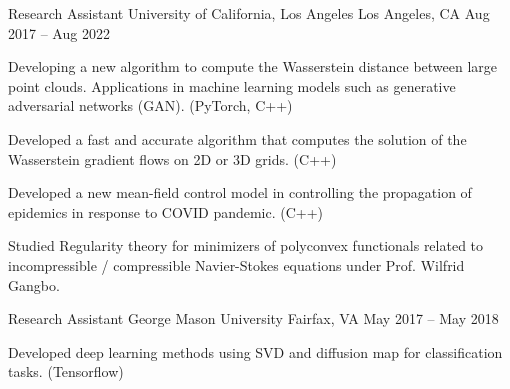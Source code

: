 

\begin{cventries}

  \cventry
    {Research Assistant} %
    {University of California, Los Angeles} %
    {Los Angeles, CA} %
    {Aug 2017 – Aug 2022} %
    {
      \begin{cvitems} %
        \item Developing a new algorithm to compute the Wasserstein distance between large point clouds. Applications in machine learning models such as generative adversarial networks (GAN). {\footnotesize (PyTorch, C++)}
          \item Developed a fast and accurate algorithm that computes the  solution of the Wasserstein gradient flows on 2D or 3D grids. {\footnotesize (C++)}
          \item Developed a new mean-field control model in controlling the propagation of epidemics in response to COVID pandemic. {\footnotesize (C++)}
          \item Studied Regularity theory for minimizers of polyconvex functionals related to incompressible / compressible Navier-Stokes equations under Prof. Wilfrid Gangbo.
      \end{cvitems}
    }

  \cventry
    {Research Assistant} %
    {George Mason University} %
    {Fairfax, VA} %
    {May 2017 – May 2018} %
    {
      \begin{cvitems} %
        \item Developed deep learning methods using SVD and diffusion map for classification tasks. {\footnotesize (Tensorflow)}
      \end{cvitems}
    }


\end{cventries}
